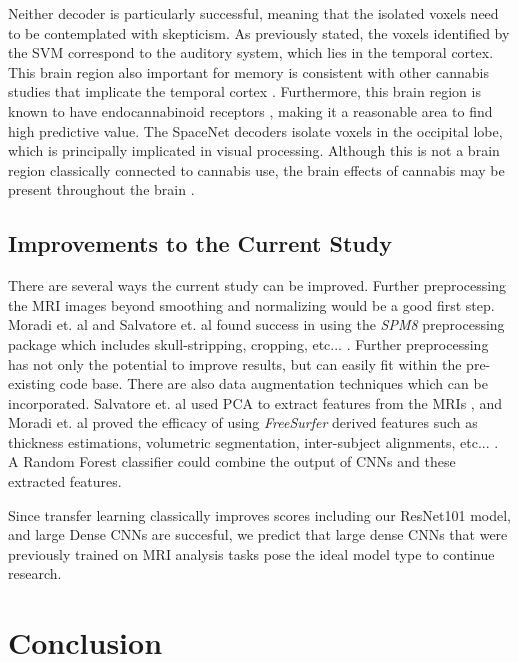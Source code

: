 \documentclass[conference]{IEEEtran}
\begin{document}
Neither decoder is particularly successful, meaning that the isolated voxels need to be contemplated with skepticism. As previously stated, the voxels identified by the SVM correspond to the auditory system, which lies in the temporal cortex. This brain region also important for memory \cite{Receptors} is consistent with other cannabis studies that implicate the temporal cortex \cite{b5}\cite{b6}\cite{b7}. Furthermore, this brain region is known to have endocannabinoid receptors \cite{Receptors}, making it a reasonable area to find high predictive value. The SpaceNet decoders isolate voxels in the occipital lobe, which is principally implicated in visual processing. Although this is not a brain region classically connected to cannabis use, the brain effects of cannabis may be present throughout the brain \cite{Occipital}.

\subsection{Improvements to the Current Study}

There are several ways the current study can be improved. Further preprocessing the MRI images beyond smoothing and normalizing would be a good first step. Moradi et. al and Salvatore et. al found success in using the \textit{SPM8} preprocessing package which includes skull-stripping, cropping, etc... \cite{Moradi} \cite{b9}. Further preprocessing has not only the potential to improve results, but can easily fit within the pre-existing code base. There are also data augmentation techniques which can be incorporated. Salvatore et. al used PCA to extract features from the MRIs \cite{b9}, and Moradi et. al proved the efficacy of using \textit{FreeSurfer} derived features such as thickness estimations, volumetric segmentation, inter-subject alignments, etc... \cite{FreeSurfer} \cite{Moradi}. A Random Forest classifier could combine the output of CNNs and these extracted features. 

Since transfer learning classically improves scores \cite{Lu} including our ResNet101 model, and large Dense CNNs are succesful, we predict that large dense CNNs that were previously trained on MRI analysis tasks pose the ideal model type to continue research. 



\section{Conclusion}
\end{document}

